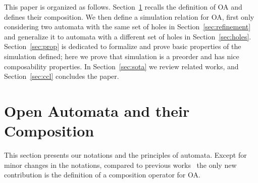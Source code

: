 \documentclass[runningheads]{llncs}
\begin{document}
This paper is organized as follows. Section~\ref{sec:background} recalls the definition of OA and defines their composition. 
We  then  define a simulation relation for OA, first only considering two automata with the same set of holes in Section~\ref{sec:refinement} and generalize it to automata with a different set of holes in Section~\ref{sec:holes}.  Section~\ref{sec:prop} is dedicated to formalize and prove basic properties of the simulation defined; here we prove that simulation is a preorder and has nice composability properties. 
In Section~\ref{sec:sota} we review related works, and Section~\ref{sec:ccl} concludes the paper.


\section{Open Automata and their Composition}\label{sec:background}

This section presents our notations and the principles of automata. Except for minor changes in the notations, compared to previous works~\cite{AMHEEMA:2023} the only new contribution is the definition of a composition operator for OA.
%

\end{document}
